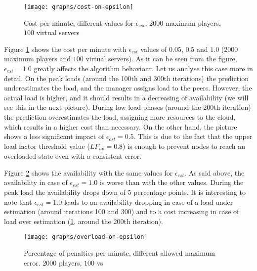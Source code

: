 \documentclass[final,10pt,a5paper]{phdimt}
\theoremstyle{definition}
\begin{document}
\begin{figure}[tbh]
\centering
\texttt{[image: graphs/cost-on-epsilon]}
\caption{Cost per minute, different values for $\epsilon_{est}$. 2000 maximum players, $100$ virtual servers}
\label{fig:cost-on-epsilon}
\end{figure}




Figure \ref{fig:cost-on-epsilon} shows the cost per minute with $\epsilon_{est}$ values of $0.05$, $0.5$ and $1.0$ (2000 maximum players and $100$ virtual servers).
As it can be seen from the figure, $\epsilon_{est} = 1.0$ greatly affects the algorithm behaviour.
Let us analyse this case more in detail. On the peak loads (around the 100th and 300th iterations) the prediction underestimates the load, and the manager assigns load to the peers. However, the actual load is higher, and it should results in a decreasing of availability (we will see this in the next picture). During low load phases (around the 200th iteration) the prediction overestimates the load, assigning more resources to the cloud, which results in a higher cost than necessary.
On the other hand, the picture shows a less significant impact of $\epsilon_{est} = 0.5$. 
This is due to the fact that the upper load factor threshold value ($LF_{up} = 0.8$) is enough to prevent nodes to reach an overloaded state even with a consistent error. 






Figure \ref{fig:overload-on-epsilon} shows the availability with the same values for $\epsilon_{est}$.
As said above, the availability in case of $\epsilon_{est} = 1.0$ is worse than with the other values.
During the peak load the availability drops down of 5 percentage points.
It is interesting to note that $\epsilon_{est} = 1.0$ leads to an availability dropping in case of a load under estimation (around iterations 100 and 300) and to a cost increasing in case of load over estimation (\ref{fig:cost-on-epsilon}, around the 200th iteration).






\begin{figure}[tbh]
\centering
\texttt{[image: graphs/overload-on-epsilon]}
\caption{Percentage of penalties per minute, different allowed maximum error.  2000 players, $100$ vs}
\label{fig:overload-on-epsilon}
\end{figure}
\end{document}
